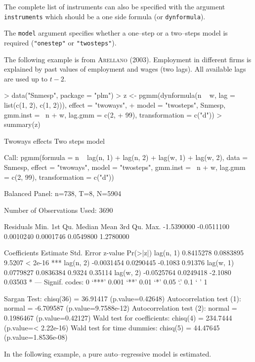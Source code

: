 \documentclass[a4paper]{article}
\begin{document}
The complete list of instruments can also be specified with the
argument \texttt{instruments} which should be a one side formula (or \texttt{dynformula}). 


The \texttt{model} argument specifies whether a one--step or a
two--steps model is required (\texttt{"onestep"} or \texttt{"twosteps"}).

The  following example is from \textsc{Arellano} (2003). Employment in
different firms is explained by past values of employment and wages
(two lags). All available lags are used up to $t-2$.

\begin{Schunk}
\begin{Sinput}
> data("Snmesp", package = "plm")
> z <- pgmm(dynformula(n ~ w, lag = list(c(1, 2), c(1, 2))), effect = "twoways", 
+     model = "twosteps", Snmesp, gmm.inst = ~n + w, lag.gmm = c(2, 
+         99), transformation = c("d"))
> summary(z)
\end{Sinput}
\begin{Soutput}
Twoways effects Two steps model

Call:
pgmm(formula = n ~ lag(n, 1) + lag(n, 2) + lag(w, 1) + lag(w, 
    2), data = Snmesp, effect = "twoways", model = "twosteps", 
    gmm.inst = ~n + w, lag.gmm = c(2, 99), transformation = c("d"))

Balanced Panel: n=738, T=8, N=5904

Number of Observations Used:  3690 

Residuals
      Min.    1st Qu.     Median       Mean    3rd Qu.       Max. 
-1.5390000 -0.0511100  0.0010240  0.0001746  0.0549800  1.2780000 

Coefficients
            Estimate Std. Error z-value Pr(>|z|)    
lag(n, 1)  0.8415278  0.0883895  9.5207  < 2e-16 ***
lag(n, 2) -0.0031454  0.0290445 -0.1083  0.91376    
lag(w, 1)  0.0779827  0.0836384  0.9324  0.35114    
lag(w, 2) -0.0525764  0.0249418 -2.1080  0.03503 *  
---
Signif. codes:  0 ‘***’ 0.001 ‘**’ 0.01 ‘*’ 0.05 ‘.’ 0.1 ‘ ’ 1 

Sargan Test: chisq(36) = 36.91417 (p.value=0.42648)
Autocorrelation test (1): normal = -6.709587 (p.value=9.7588e-12)
Autocorrelation test (2): normal = 0.1986467 (p.value=0.42127)
Wald test for coefficients: chisq(4) = 234.7444 (p.value=< 2.22e-16)
Wald test for time dummies: chisq(5) = 44.47645 (p.value=1.8536e-08)
\end{Soutput}
\end{Schunk}

In the following example, a pure auto--regressive model is
estimated.
\end{document}
